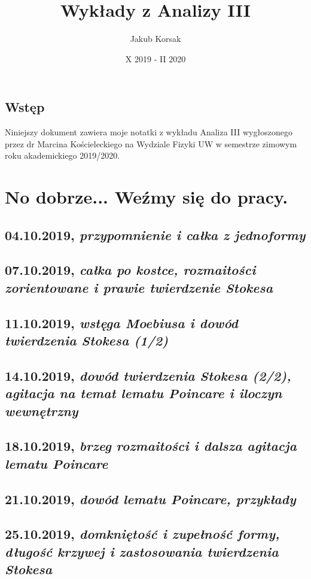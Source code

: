 \documentclass[a5paper, oneside]{memoir}
\title{\Huge \textbf{Wykłady z Analizy III}}
\author{Jakub Korsak}
\date{X 2019 - II 2020}
\let\LaTeXStandardTableOfContents\tableofcontents
\renewcommand{\tableofcontents}{%
\begingroup%
\renewcommand{\bfseries}{\relax}%
\LaTeXStandardTableOfContents%
\endgroup%
}%
\begin{document}
\frontmatter
\maketitle
\pagebreak
\tableofcontents

\chapter{Wstęp}
Niniejszy dokument zawiera moje notatki z wykładu Analiza III wygłoszonego przez dr Marcina Kościeleckiego na Wydziale Fizyki UW w semestrze zimowym roku akademickiego 2019/2020.

\mainmatter
\part{No dobrze... Weźmy się do pracy.}
\chapter{04.10.2019, \textit{przypomnienie i całka z jednoformy}}

\chapter{07.10.2019, \textit{całka po kostce, rozmaitości zorientowane i prawie twierdzenie Stokesa}}

\chapter{11.10.2019, \textit{wstęga Moebiusa i dowód twierdzenia Stokesa (1/2)}}

\chapter{14.10.2019, \textit{dowód twierdzenia Stokesa (2/2), agitacja na temat lematu Poincare i iloczyn wewnętrzny}}

\chapter{18.10.2019, \textit{brzeg rozmaitości i dalsza agitacja lematu Poincare}}

\chapter{21.10.2019, \textit{dowód lematu Poincare, przykłady}}

\chapter{25.10.2019, \textit{domkniętość i zupełność formy, długość krzywej i zastosowania twierdzenia Stokesa}}

\end{document}
